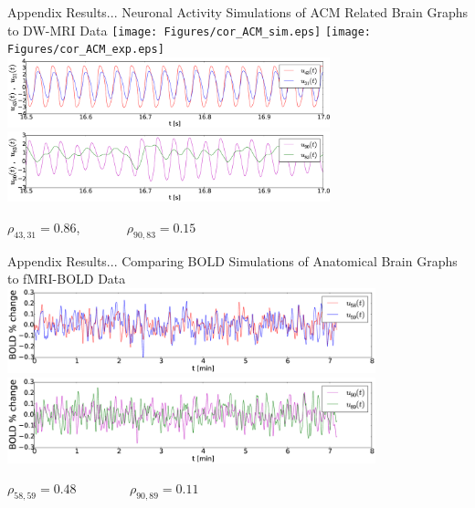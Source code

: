 \documentclass{beamer}
\begin{document}
\begin{frame}{Appendix}
Results... \break
\footnotesize{Neuronal Activity Simulations of ACM Related Brain Graphs to DW-MRI Data} 
	\centering
	 \texttt{[image: Figures/cor\_ACM\_sim.eps]}  
   	 \texttt{[image: Figures/cor\_ACM\_exp.eps]} \\
    \centering
    \includegraphics[width=0.7\textwidth]{Figures/cor_ACM_sim_no_best.eps}\\ 
	\centering    
    \includegraphics[width=0.7\textwidth]{Figures/cor_ACM_sim_no_worst.eps} 


	\tiny{$\rho_{43,31}=0.86$, ~~~~~~ $\rho_{90,83}=0.15$}	
	
	
\end{frame}




\begin{frame}{Appendix}
Results...\break
\footnotesize{Comparing BOLD Simulations of Anatomical Brain Graphs to fMRI-BOLD Data} 
\break
\break
	\centering
	 \includegraphics[width=0.8\textwidth]{Figures/cor_BOLD_ACM_sim_no_best.eps} \\
   	 \includegraphics[width=0.8\textwidth]{Figures/cor_BOLD_ACM_sim_no_worst.eps} 

  \tiny{ $\rho_{58,59}=0.48$ ~~~~~~~ $\rho_{90,89}=0.11$ }
\end{frame}
\end{document}
